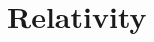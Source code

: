 \section{Relativity}



\begin{comment}

Two Interpretations of One Side of Einstein’s Equations
https://www.youtube.com/watch?v=lgIsFV6njZU


Math needed: 
-for general relativity: tensor calculus, differential geometry; 
-for special relativity: hyperbolic numbers/geometry









\end{comment}

